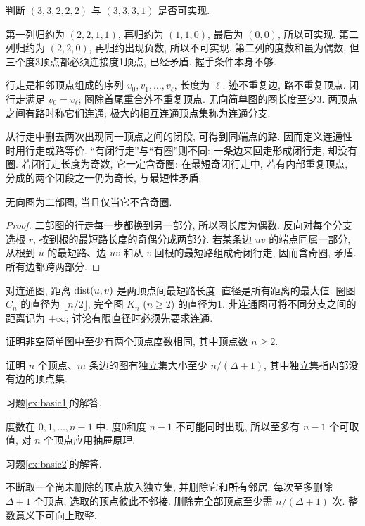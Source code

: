 \begin{example}
判断 $(3,3,2,2,2)$ 与 $(3,3,3,1)$ 是否可实现.
\end{example}
\begin{solution}
第一列归约为 $(2,2,1,1)$, 再归约为 $(1,1,0)$, 最后为 $(0,0)$, 所以可实现. 第二列归约为 $(2,2,0)$, 再归约出现负数, 所以不可实现. 第二列的度数和虽为偶数, 但三个度3顶点都必须连接度1顶点, 已经矛盾. 握手条件本身不够.
\end{solution}
\begin{definition}
行走是相邻顶点组成的序列 $v_0,v_1,\ldots,v_\ell$, 长度为 $\ell$. 迹不重复边, 路不重复顶点. 闭行走满足 $v_0=v_\ell$; 圈除首尾重合外不重复顶点. 无向简单图的圈长度至少3. 两顶点之间有路时称它们连通; 极大的相互连通顶点集称为连通分支.
\end{definition}
从行走中删去两次出现同一顶点之间的闭段, 可得到同端点的路. 因而定义连通性时用行走或路等价. “有闭行走”与“有圈”则不同: 一条边来回走形成闭行走, 却没有圈. 若闭行走长度为奇数, 它一定含奇圈: 在最短奇闭行走中, 若有内部重复顶点, 分成的两个闭段之一仍为奇长, 与最短性矛盾.
\begin{theorem}\label{thm:bipartite}
无向图为二部图, 当且仅当它不含奇圈.
\end{theorem}
\begin{proof}
二部图的行走每一步都换到另一部分, 所以圈长度为偶数. 反向对每个分支选根 $r$, 按到根的最短路长度的奇偶分成两部分. 若某条边 $uv$ 的端点同属一部分, 从根到 $u$ 的最短路、边 $uv$ 和从 $v$ 回根的最短路组成奇闭行走, 因而含奇圈, 矛盾. 所有边都跨两部分.
\end{proof}
对连通图, 距离 $\operatorname{dist}(u,v)$ 是两顶点间最短路长度, 直径是所有距离的最大值. 圈图 $C_n$ 的直径为 $\lfloor n/2\rfloor$, 完全图 $K_n$ ($n\ge2$) 的直径为1. 非连通图可将不同分支之间的距离记为 $+\infty$; 讨论有限直径时必须先要求连通.
\begin{exercise}\label{ex:basic1}
证明非空简单图中至少有两个顶点度数相同, 其中顶点数 $n\ge2$.
\end{exercise}
\begin{exercise}\label{ex:basic2}
证明 $n$ 个顶点、$m$ 条边的图有独立集大小至少 $n/(\Delta+1)$, 其中独立集指内部没有边的顶点集.
\end{exercise}
习题\ref{ex:basic1}的解答.
\begin{solution}
度数在 $0,1,\ldots,n-1$ 中. 度0和度 $n-1$ 不可能同时出现, 所以至多有 $n-1$ 个可取值, 对 $n$ 个顶点应用抽屉原理.
\end{solution}
习题\ref{ex:basic2}的解答.
\begin{solution}
不断取一个尚未删除的顶点放入独立集, 并删除它和所有邻居. 每次至多删除 $\Delta+1$ 个顶点; 选取的顶点彼此不邻接. 删除完全部顶点至少需 $n/(\Delta+1)$ 次. 整数意义下可向上取整.
\end{solution}

